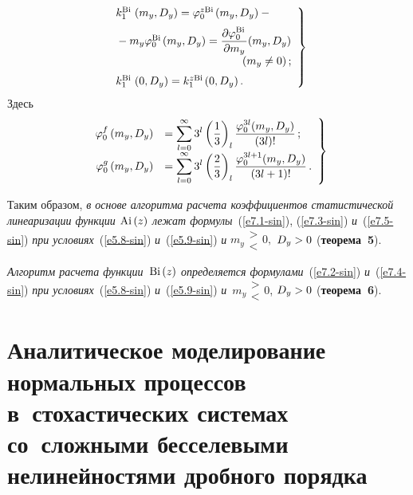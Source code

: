 \begin{multicols}{2}
          \begin{equation}
          \left.
          \begin{array}{l}
     k_1^{\Bi} \left(m_y, D_y\right) = \varphi_0^{z\Bi} (m_y, D_y) - {}\\[6pt]
{}-     m_y \varphi_0^{\Bi} (m_y, D_y) = 
     \fr{\prt \varphi_0^{\Bi}}{\prt m_y} (m_y, D_y)\\[6pt]
     \hspace*{40mm} (m_y\ne 0)\,;\\[6pt]
    k_1^{\Bi} \left(0, D_y\right) = k_1^{z\Bi} (0, D_y)\,.
    \end{array}
    \right\}
    \label{e7.4-sin}
\end{equation}
Здесь
    \begin{equation}
    \left.
    \begin{array}{rl}
    \varphi_0^f \left(m_y, D_y\right) &= \displaystyle\sum\limits_{l=0}^\infty 3^l 
    \left(\displaystyle\frac{\displaystyle 1\mathstrut}{\displaystyle 3\mathstrut}\right)_l 
    \displaystyle\frac{\displaystyle \varphi_0^{3l} (m_y, D_y)\mathstrut}{\displaystyle (3l)!\mathstrut}\,;\\[6pt]
    \varphi_0^g \left(m_y, D_y\right) &= 
\displaystyle    \sum\limits_{l=0}^\infty 3^l \left(\displaystyle\frac{\displaystyle 2\mathstrut}{\displaystyle 3\mathstrut}\right)_l 
    \displaystyle\frac{\displaystyle \varphi_0^{3l+1} (m_y, D_y)\mathstrut}{\displaystyle (3l+1)!\mathstrut}\,.
    \end{array}
    \right\}
    \label{e7.5-sin}
    \end{equation}

Таким образом, \textit{в основе алгоритма расчета коэффициентов 
статистической линеаризации функции $\mathrm{Ai}\,(z)$ лежат формулы}~(\ref{e7.1-sin}), 
(\ref{e7.3-sin}) \textit{и}~(\ref{e7.5-sin}) \textit{при условиях}~(\ref{e5.8-sin}) 
\textit{и}~(\ref{e5.9-sin}) \textit{и} $m_y \begin{matrix}
>\\ < \end{matrix} 0,$%
$D_y \hm>0$ (\textbf{теорема~5}).
 
 \smallskip

\textit{Алгоритм расчета функции~$\mathrm{Bi}\,(z)$ определяется формулами}~(\ref{e7.2-sin}) 
\textit{и}~(\ref{e7.4-sin}) \textit{при условиях}~(\ref{e5.8-sin}) \textit{и}~(\ref{e5.9-sin}) 
\textit{и}~$m_y \begin{matrix}
> \\  <\end{matrix} %
 0$, $D_y \hm>0$ (\textbf{теорема~6}).


\section{Аналитическое моделирование нормальных процессов 
в~стохастических системах со~сложными бесселевыми нелинейностями дробного порядка}


\end{multicols}

